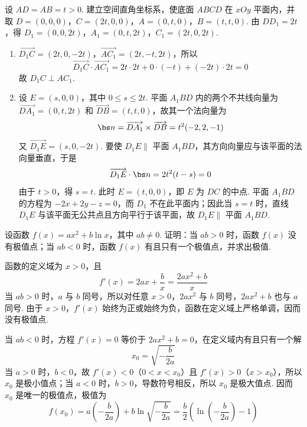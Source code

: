 \begin{solution}
设 \(AD=AB=t>0\). 建立空间直角坐标系，使底面 \(ABCD\) 在 \(xOy\) 平面内，并取 \(D=(0,0,0)\)，\(C=(2t,0,0)\)，\(A=(0,t,0)\)，\(B=(t,t,0)\). 由 \(DD_{1}=2t\)，得 \(D_{1}=(0,0,2t)\)，\(A_{1}=(0,t,2t)\)，\(C_{1}=(2t,0,2t)\).

\begin{enumerate}
\item \(\overrightarrow{D_{1}C}=(2t,0,-2t)\)，\(\overrightarrow{AC_{1}}=(2t,-t,2t)\)，所以
\[
\overrightarrow{D_{1}C}\cdot\overrightarrow{AC_{1}}=2t\cdot2t+0\cdot(-t)+(-2t)\cdot2t=0
\]
故 \(D_{1}C\perp AC_{1}\).
\item 设 \(E=(s,0,0)\)，其中 \(0\leqslant s\leqslant2t\). 平面 \(A_{1}BD\) 内的两个不共线向量为 \(\overrightarrow{DA_{1}}=(0,t,2t)\) 和 \(\overrightarrow{DB}=(t,t,0)\)，故其一个法向量为
\[
\bs n=\overrightarrow{DA_{1}}\times\overrightarrow{DB}=t^{2}(-2,2,-1)
\]
又 \(\overrightarrow{D_{1}E}=(s,0,-2t)\). 要使 \(D_{1}E\parallel\) 平面 \(A_{1}BD\)，其方向向量应与该平面的法向量垂直，于是
\[
\overrightarrow{D_{1}E}\cdot\bs n=2t^{2}(t-s)=0
\]
由于 \(t>0\)，得 \(s=t\). 此时 \(E=(t,0,0)\)，即 \(E\) 为 \(DC\) 的中点. 平面 \(A_{1}BD\) 的方程为 \(-2x+2y-z=0\)，而 \(D_{1}\) 不在此平面内；因此当 \(s=t\) 时，直线 \(D_{1}E\) 与该平面无公共点且方向平行于该平面，故 \(D_{1}E\parallel\) 平面 \(A_{1}BD\).
\end{enumerate}
\end{solution}

\begin{problem}
设函数 \( f(x) = ax^2 + b\ln x \)，其中 \( ab \neq 0 \). 证明：当 \( ab > 0 \) 时，函数 \( f(x) \) 没有极值点；当 \( ab < 0 \) 时，函数 \( f(x) \) 有且只有一个极值点，并求出极值.
\end{problem}

\begin{solution}
函数的定义域为 \(x>0\)，且
\[
f'(x)=2ax+\frac{b}{x}=\frac{2ax^{2}+b}{x}
\]
当 \(ab>0\) 时，\(a\) 与 \(b\) 同号，所以对任意 \(x>0\)，\(2ax^{2}\) 与 \(b\) 同号，\(2ax^{2}+b\) 也与 \(a\) 同号. 由于 \(x>0\)，\(f'(x)\) 始终为正或始终为负，函数在定义域上严格单调，因而没有极值点.

当 \(ab<0\) 时，方程 \(f'(x)=0\) 等价于 \(2ax^{2}+b=0\)，在定义域内有且只有一个解
\[
x_{0}=\sqrt{-\frac{b}{2a}}
\]
当 \(a>0\) 时，\(b<0\)，故 \(f'(x)<0\)（\(0<x<x_{0}\)）且 \(f'(x)>0\)（\(x>x_{0}\)），所以 \(x_{0}\) 是极小值点；当 \(a<0\) 时，\(b>0\)，导数符号相反，所以 \(x_{0}\) 是极大值点. 因而 \(x_{0}\) 是唯一的极值点，极值为
\[
f(x_{0})=a\left(-\frac{b}{2a}\right)+b\ln\sqrt{-\frac{b}{2a}}=\frac{b}{2}\left(\ln\left(-\frac{b}{2a}\right)-1\right)
\]
\end{solution}

